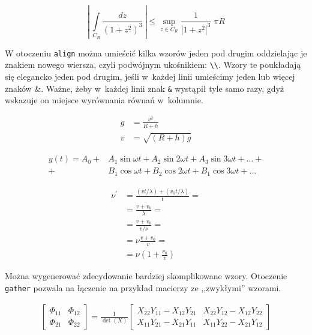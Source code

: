 \begin{equation*}
    \left| \, \int\limits_{C_R} \frac{dz}{\left( 1+z^2 \right )^3} \, \right| \leqslant \sup\limits_{z \in C_R} \frac{1}{\left| 1+z^2 \right|^3} \; \pi R
\end{equation*}

W otoczeniu \texttt{align} można umieścić kilka wzorów jeden pod drugim oddzielając je znakiem nowego wiersza, czyli podwójnym ukośnikiem: \texttt{\textbackslash{}\textbackslash{}}. Wzory te poukładają się elegancko jeden pod drugim, jeśli w~każdej linii umieścimy jeden lub więcej znaków \&. Ważne, żeby w~każdej linii znak \texttt{\&} wystąpił tyle samo razy, gdyż wskazuje on miejsce wyrównania równań w~kolumnie.

\begin{align}
    g & = \frac{v^2}{R+h}               \\
    v & = \sqrt{ \left( R+h \right) g }
\end{align}

\begin{align}
    y(t) = A_0
    + & A_1 \sin \omega t +
    A_2 \sin 2 \omega t +
    A_3 \sin 3 \omega t + \ldots + \nonumber \\
    + & B_1 \cos \omega t +
    B_2 \cos 2 \omega t +
    B_1 \cos 3 \omega t + \ldots
\end{align}

\begin{align}
    \nu^\prime & = \frac{\left(vt / \lambda \right) + \left( v_0t / \lambda \right)}{t} = \nonumber \\
               & = \frac{v + v_0}{\lambda} = \nonumber                                              \\
               & = \frac{v + v_0}{v / \nu} = \nonumber                                              \\
               & = \nu \frac{v+v_0}{v} = \nonumber                                                  \\
               & = \nu \left( 1 + \frac{v_0}{v} \right)
\end{align}

Można wygenerować zdecydowanie bardziej skomplikowane wzory. Otoczenie \texttt{gather} pozwala na łączenie na przykład macierzy ze ,,zwykłymi'' wzorami.

\begin{gather}
    \begin{bmatrix} \Phi_{11} & \Phi_{12} \\ \Phi_{21} & \Phi_{22} \end{bmatrix}
    =
    \frac{1}{\det(X)}
    \begin{bmatrix}
        X_{22} Y_{11} - X_{12} Y_{21} &
        X_{22} Y_{12} - X_{12} Y_{22}   \\
        X_{11} Y_{21} - X_{21} Y_{11} &
        X_{11} Y_{22} - X_{21} Y_{12}
    \end{bmatrix}
\end{gather}

